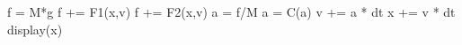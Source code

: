 \begin{code_cpp}
f = M*g
f += F1(x,v)
f += F2(x,v)
a = f/M
a = C(a)
v += a * dt
x += v * dt
display(x)
\end{code_cpp}
